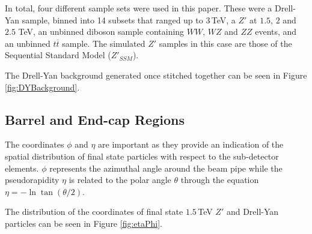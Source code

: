 \documentclass{article}
\begin{document}
In total, four different sample sets were used in this paper. These were a Drell-Yan sample, binned into 14 subsets that ranged up to $3\,$TeV, a $Z'$ at $1.5$, $2$ and $2.5$ TeV, an unbinned diboson sample containing $WW$, $WZ$ and $ZZ$ events, and an unbinned $t\overline{t}$ sample. The simulated $Z'$ samples in this case are those of the Sequential Standard Model ($Z'_{SSM}$).

The Drell-Yan background generated once stitched together can be seen in Figure \ref{fig:DYBackground}.  



\subsection{Barrel and End-cap Regions}
\label{sec:study_barrelEndcap}
The coordinates $\phi$ and $\eta$ are important as they provide an indication of the spatial distribution of final state particles with respect to the sub-detector elements. $\phi$ represents the azimuthal angle around the beam pipe while the pseudorapidity $\eta$ is related to the polar angle $\theta$ through the equation $\eta = -\ln \tan (\theta/2)$. 

The distribution of the coordinates of final state $1.5\,$TeV $Z'$ and Drell-Yan particles can be seen in Figure \ref{fig:etaPhi}.
\end{document}
